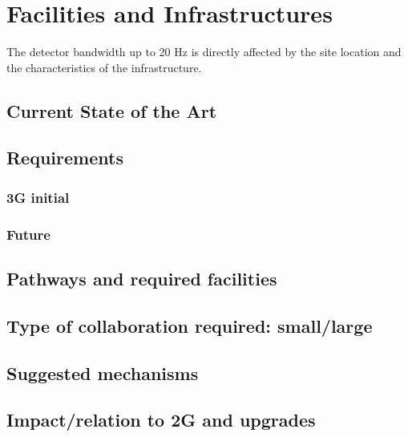 \section{Facilities and Infrastructures}
The detector bandwidth up to 20 Hz is directly affected by  the site location and the characteristics of the infrastructure.
\subsection{Current State of the Art}
\subsection{Requirements}
\subsubsection{3G initial}
\subsubsection{Future}
\subsection{Pathways and required facilities}
\subsection{Type of collaboration required:  small/large}
\subsection{Suggested mechanisms}
\subsection{Impact/relation to 2G and upgrades}